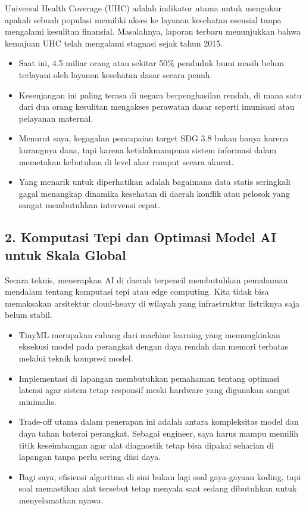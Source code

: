 \documentclass[
  letterpaper,
  DIV=11,
  numbers=noendperiod]{scrreprt}
\begin{document}
Universal Health Coverage (UHC) adalah indikator utama untuk mengukur
apakah sebuah populasi memiliki akses ke layanan kesehatan esensial
tanpa mengalami kesulitan finansial. Masalahnya, laporan terbaru
menunjukkan bahwa kemajuan UHC telah mengalami stagnasi sejak tahun
2015.

\begin{itemize}
\item
  Saat ini, 4.5 miliar orang atau sekitar 50\% penduduk bumi masih belum
  terlayani oleh layanan kesehatan dasar secara penuh.
\item
  Kesenjangan ini paling terasa di negara berpenghasilan rendah, di mana
  satu dari dua orang kesulitan mengakses perawatan dasar seperti
  imunisasi atau pelayanan maternal.
\item
  Menurut saya, kegagalan pencapaian target SDG 3.8 bukan hanya karena
  kurangnya dana, tapi karena ketidakmampuan sistem informasi dalam
  memetakan kebutuhan di level akar rumput secara akurat.
\item
  Yang menarik untuk diperhatikan adalah bagaimana data statis
  seringkali gagal menangkap dinamika kesehatan di daerah konflik atau
  pelosok yang sangat membutuhkan intervensi cepat.
\end{itemize}

\subsection{2. Komputasi Tepi dan Optimasi Model AI untuk Skala
Global}\label{komputasi-tepi-dan-optimasi-model-ai-untuk-skala-global}

Secara teknis, menerapkan AI di daerah terpencil membutuhkan pemahaman
mendalam tentang komputasi tepi atau edge computing. Kita tidak bisa
memaksakan arsitektur cloud-heavy di wilayah yang infrastruktur
listriknya saja belum stabil.

\begin{itemize}
\item
  TinyML merupakan cabang dari machine learning yang memungkinkan
  eksekusi model pada perangkat dengan daya rendah dan memori terbatas
  melalui teknik kompresi model.
\item
  Implementasi di lapangan membutuhkan pemahaman tentang optimasi
  latensi agar sistem tetap responsif meski hardware yang digunakan
  sangat minimalis.
\item
  Trade-off utama dalam penerapan ini adalah antara kompleksitas model
  dan daya tahan baterai perangkat. Sebagai engineer, saya harus mampu
  memilih titik keseimbangan agar alat diagnostik tetap bisa dipakai
  seharian di lapangan tanpa perlu sering diisi daya.
\item
  Bagi saya, efisiensi algoritma di sini bukan lagi soal gaya-gayaan
  koding, tapi soal memastikan alat tersebut tetap menyala saat sedang
  dibutuhkan untuk menyelamatkan nyawa.
\end{itemize}
\end{document}
